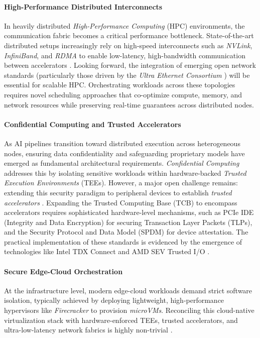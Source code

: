 \documentclass[11pt,a4paper]{article}
\begin{document}
\paragraph{High-Performance Distributed Interconnects}
In heavily distributed \textit{High-Performance Computing} (HPC) environments, the communication fabric becomes a critical performance bottleneck. State-of-the-art distributed setups increasingly rely on high-speed interconnects such as \textit{NVLink}, \textit{InfiniBand}, and \textit{RDMA} to enable low-latency, high-bandwidth communication between accelerators \cite{li2019evaluating}. Looking forward, the integration of emerging open network standards (particularly those driven by the \textit{Ultra Ethernet Consortium} \cite{10614558}) will be essential for scalable HPC. Orchestrating workloads across these topologies requires novel scheduling approaches that co-optimize compute, memory, and network resources while preserving real-time guarantees across distributed nodes.

\paragraph{Confidential Computing and Trusted Accelerators}
As AI pipelines transition toward distributed execution across heterogeneous nodes, ensuring data confidentiality and safeguarding proprietary models have emerged as fundamental architectural requirements. \textit{Confidential Computing} addresses this by isolating sensitive workloads within hardware-backed \textit{Trusted Execution Environments} (TEEs). However, a major open challenge remains: extending this security paradigm to peripheral devices to establish \textit{trusted accelerators} \cite{giantsidi2025tnic}. Expanding the Trusted Computing Base (TCB) to encompass accelerators requires sophisticated hardware-level mechanisms, such as PCIe IDE (Integrity and Data Encryption) for securing Transaction Layer Packets (TLPs)\cite{pciide}, and the Security Protocol and Data Model (SPDM)\cite{spdm} for device attestation. The practical implementation of these standards is evidenced by the emergence of technologies like Intel TDX Connect \cite{TDXCONNECT} and AMD SEV Trusted I/O \cite{AMDTIO}.

\paragraph{Secure Edge-Cloud Orchestration}
At the infrastructure level, modern edge-cloud workloads demand strict software isolation, typically achieved by deploying lightweight, high-performance hypervisors like \textit{Firecracker} \cite{agache2020firecracker} to provision \textit{microVMs}. Reconciling this cloud-native virtualization stack with hardware-enforced TEEs, trusted accelerators, and ultra-low-latency network fabrics is highly non-trivial \cite{holmes2024severifast, barletta_et_al:LIPIcs.ECRTS.2022.15}.
\end{document}
